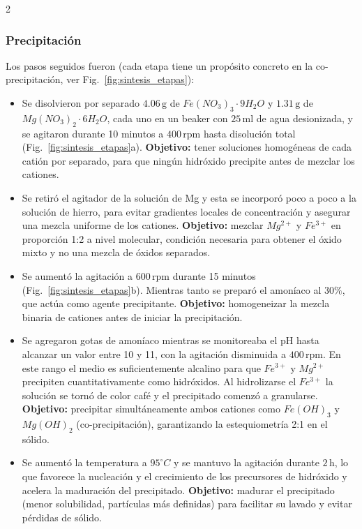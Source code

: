 \documentclass{article}
\begin{document}
\begin{multicols}{2}
\subsubsection{Precipitación}
Los pasos seguidos fueron (cada etapa tiene un propósito concreto en la co-precipitación, ver Fig.~\ref{fig:sintesis_etapas}):

\begin{itemize}

\item Se disolvieron por separado $4.06\,\mathrm{g}$ de $Fe(NO_3)_3\cdot 9H_2O$ y $1.31\,\mathrm{g}$ de $Mg(NO_3)_2\cdot 6H_2O$, cada uno en un beaker con $25\,\mathrm{ml}$ de agua desionizada, y se agitaron durante 10 minutos a $400\,\mathrm{rpm}$ hasta disolución total (Fig.~\ref{fig:sintesis_etapas}a). \textbf{Objetivo:} tener soluciones homogéneas de cada catión por separado, para que ningún hidróxido precipite antes de mezclar los cationes.

\item Se retiró el agitador de la solución de Mg y esta se incorporó poco a poco a la solución de hierro, para evitar gradientes locales de concentración y asegurar una mezcla uniforme de los cationes. \textbf{Objetivo:} mezclar $Mg^{2+}$ y $Fe^{3+}$ en proporción 1:2 a nivel molecular, condición necesaria para obtener el óxido mixto y no una mezcla de óxidos separados.

\item Se aumentó la agitación a $600\,\mathrm{rpm}$ durante 15 minutos (Fig.~\ref{fig:sintesis_etapas}b). Mientras tanto se preparó el amoníaco al $30\%$, que actúa como agente precipitante. \textbf{Objetivo:} homogeneizar la mezcla binaria de cationes antes de iniciar la precipitación.

\item Se agregaron gotas de amoníaco mientras se monitoreaba el pH hasta alcanzar un valor entre 10 y 11, con la agitación disminuida a $400\,\mathrm{rpm}$. En este rango el medio es suficientemente alcalino para que $Fe^{3+}$ y $Mg^{2+}$ precipiten cuantitativamente como hidróxidos. Al hidrolizarse el $Fe^{3+}$ la solución se tornó de color café y el precipitado comenzó a granularse. \textbf{Objetivo:} precipitar simultáneamente ambos cationes como $Fe(OH)_3$ y $Mg(OH)_2$ (co-precipitación), garantizando la estequiometría 2:1 en el sólido.

\item Se aumentó la temperatura a $95^\circ C$ y se mantuvo la agitación durante $2\,\mathrm{h}$, lo que favorece la nucleación y el crecimiento de los precursores de hidróxido y acelera la maduración del precipitado. \textbf{Objetivo:} madurar el precipitado (menor solubilidad, partículas más definidas) para facilitar su lavado y evitar pérdidas de sólido.


\end{itemize}
\end{multicols}
\end{document}
